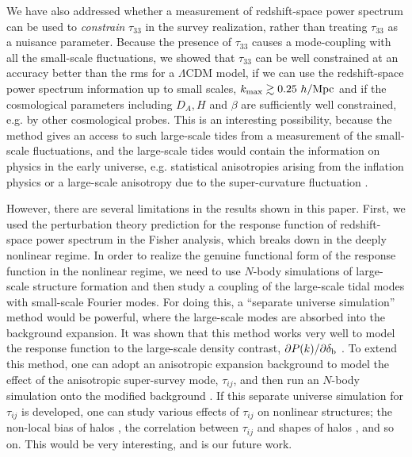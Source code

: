 \documentclass[prd,onecolumn,notitlepage,amsmath,amssymb,floatfix,superscriptaddress]{revtex4-1}
\newcommand{\br}{{\rm b}}
\begin{document}
We have also addressed whether a measurement of redshift-space power spectrum can be used to {\em constrain}  
$\tau_{33}$ in the survey realization, rather than treating $\tau_{33}$ as a nuisance parameter. Because the presence of $\tau_{33}$ causes 
a mode-coupling with all the small-scale fluctuations, we showed that $\tau_{33}$ can be well constrained at an accuracy better than the rms 
for a $\Lambda$CDM model, if we can use the redshift-space power spectrum information up to small scales, $k_{\rm max}\gtrsim 0.25~{h/{\rm Mpc}}$ and if 
the cosmological parameters including $D_A, H$ and $\beta$ are sufficiently well constrained, e.g. by other cosmological probes.  
This is an interesting possibility, because the method gives an access to such large-scale tides from a measurement of the small-scale fluctuations, and 
the large-scale 
tides would contain the information on physics in the early universe, e.g. statistical anisotropies arising from the inflation physics \cite{JeongKamionkowski:12} or a large-scale anisotropy due to the super-curvature fluctuation \cite{Byrnesetal:16}.


However, there are several limitations in the results shown in this paper. First, 
we used the perturbation theory prediction for the response function of redshift-space power spectrum in the Fisher analysis, which breaks down in the deeply nonlinear regime. In order to realize the genuine functional form of the response function in the nonlinear regime, 
we need to use $N$-body simulations of large-scale structure formation and then study a coupling of the large-scale tidal modes with small-scale Fourier modes. For doing this, a ``separate universe simulation'' method would be powerful, where the large-scale modes are absorbed into the background expansion. It was shown that this method works very well to model the response function to the large-scale density contrast, $\partial P(k)/\partial 
\delta_\br$ \cite{Lietal:14a,Lietal:14b,Wagneretal:15,Lietal:16,Baldaufetal:16,Huetal16}. To extend this method, one can adopt an anisotropic expansion background to model the effect of the anisotropic super-survey mode, $\tau_{ij}$, and then run  an $N$-body simulation onto the modified background \citep[e.g., see Ref.][for the related discussion]{IpSchmidt:17}. If this separate universe simulation 
for $\tau_{ij}$ is developed, one can study various effects of $\tau_{ij}$ on nonlinear structures; the non-local bias of halos \citep{Chanetal:12,Saitoetal:14}, the correlation between $\tau_{ij}$ and shapes of halos \cite{Chisarietal:16,Okumuraetal:17}, and so on. This would be very interesting, and is our future work. 
\end{document}
